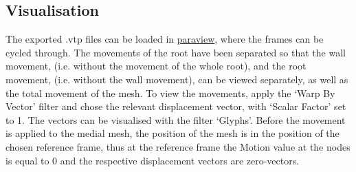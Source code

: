 \documentclass{article}
\begin{document}
\subsection*{Visualisation}
The exported .vtp files can be loaded in \href{https://www.paraview.org}{paraview}, where the frames can be cycled through. The movements of the root have been separated so that the wall movement, (i.e. without the movement of the whole root), and the root movement, (i.e. without the wall movement), can be viewed separately, as well as the total movement of the mesh. To view the movements, apply the `Warp By Vector' filter and chose the relevant displacement vector, with `Scalar Factor' set to 1. The vectors can be visualised with the filter `Glyphs'. Before the movement is applied to the medial mesh, the position of the mesh is in the position of the chosen reference frame, thus at the reference frame the Motion value at the nodes is equal to 0 and the respective displacement vectors are zero-vectors.

\end{document}
